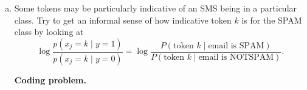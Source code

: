 \documentclass[12pt,letterpaper,boxed]{hmcpset}
\begin{document}
\begin{solution}
\begin{enumerate}[(a)]
    \item Some tokens may be particularly indicative of an SMS being in a particular class. Try to get an informal sense of how indicative token $k$ is for the SPAM class by looking at 
    \[
    \log \frac{p(x_j = k \mid y = 1)}{p(x_j = k \mid y = 0)} = \log \frac{P(\text{token } k \mid \text{email is SPAM})}{P(\text{token } k \mid \text{email is NOTSPAM})}.
    \]

    \textbf{Coding problem.}
  \end{enumerate}
\end{solution}
\end{document}
